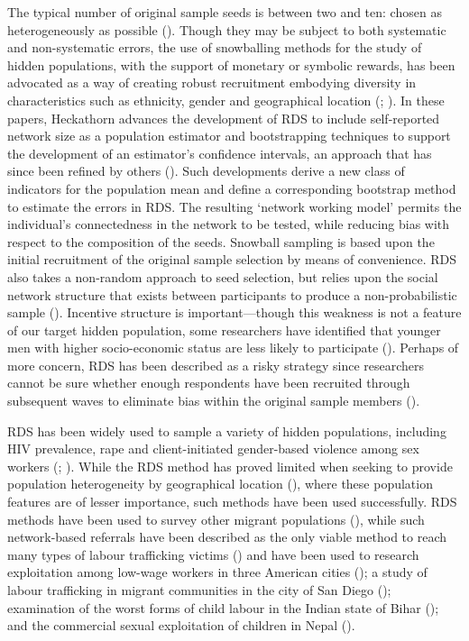 \documentclass[
  12pt,
  letterpaper,
  DIV=11,
  numbers=noendperiod]{scrartcl}
\theoremstyle{plain}
\theoremstyle{definition}
\begin{document}
The typical number of original sample seeds is between two and ten:
chosen as heterogeneously as possible (\textcite{gile_methods_2018}).
Though they may be subject to both systematic and non-systematic errors,
the use of snowballing methods for the study of hidden populations, with
the support of monetary or symbolic rewards, has been advocated as a way
of creating robust recruitment embodying diversity in characteristics
such as ethnicity, gender and geographical location
(\textcite{heckathorn_respondent-driven_1997};
\textcite{heckathorn_respondent-driven_2002}). In these papers,
Heckathorn advances the development of RDS to include self-reported
network size as a population estimator and bootstrapping techniques to
support the development of an estimator's confidence intervals, an
approach that has since been refined by others
(\textcite{gile_network_2015}). Such developments derive a new class of
indicators for the population mean and define a corresponding bootstrap
method to estimate the errors in RDS. The resulting `network working
model' permits the individual's connectedness in the network to be
tested, while reducing bias with respect to the composition of the
seeds. Snowball sampling is based upon the initial recruitment of the
original sample selection by means of convenience. RDS also takes a
non-random approach to seed selection, but relies upon the social
network structure that exists between participants to produce a
non-probabilistic sample (\textcite{goodman_comment_2011}). Incentive
structure is important---though this weakness is not a feature of our
target hidden population, some researchers have identified that younger
men with higher socio-economic status are less likely to participate
(\textcite{mccreesh_respondent_2013}). Perhaps of more concern, RDS has
been described as a risky strategy since researchers cannot be sure
whether enough respondents have been recruited through subsequent waves
to eliminate bias within the original sample members
(\textcite{vincent_estimating_2017}).

RDS has been widely used to sample a variety of hidden populations,
including HIV prevalence, rape and client-initiated gender-based
violence among sex workers (\textcite{mccreesh_evaluation_2012};
\textcite{schwitters_prevalence_2012}). While the RDS method has proved
limited when seeking to provide population heterogeneity by geographical
location (\textcite{mccreesh_evaluation_2011}), where these population
features are of lesser importance, such methods have been used
successfully. RDS methods have been used to survey other migrant
populations (\textcite{tyldum_surveying_2021}), while such network-based
referrals have been described as the only viable method to reach many
types of labour trafficking victims (\textcite{zhang_measuring_2012})
and have been used to research exploitation among low-wage workers in
three American cities (\textcite{bernhardt_broken_2009}); a study of
labour trafficking in migrant communities in the city of San Diego
(\textcite{vincent_estimating_2017}); examination of the worst forms of
child labour in the Indian state of Bihar
(\textcite{zhang_victims_2019}); and the commercial sexual exploitation
of children in Nepal (\textcite{jordan_overcoming_2020}).
\end{document}
